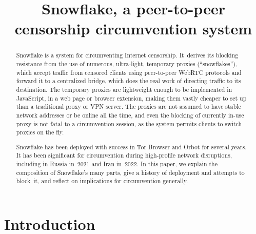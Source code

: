 \documentclass[letterpaper,twocolumn]{article}
\begin{document}
\date{}

\title{Snowflake, a peer-to-peer censorship circumvention system}

\author{}

\maketitle
{}

\begin{abstract}
Snowflake is a system for circumventing Internet censorship.
It~derives its blocking resistance from
the use of numerous, ultra-light, temporary proxies (``snowflakes''),
which accept traffic from censored clients using peer-to-peer WebRTC protocols
and forward it to a centralized bridge,
which does the real work of directing traffic to its destination.
The temporary proxies are lightweight enough to be implemented in JavaScript,
in a web page or browser extension,
making them vastly cheaper to set up than
a traditional proxy or VPN server.
The proxies are not assumed to have stable network addresses
or be online all the time,
and even the blocking of currently in-use proxy
is not fatal to a circumvention session,
as the system permits clients to switch proxies on the fly.


Snowflake has been deployed with success
in Tor Browser and Orbot for several years.
It has been significant for circumvention
during high-profile network disruptions,
including in Russia in~2021 and Iran in~2022.
In this paper, we explain the composition of Snowflake's many parts,
give a history of deployment and attempts to block~it,
and reflect on implications for circumvention generally.
\end{abstract}


\section{Introduction}
\label{sec:intro}
\end{document}
